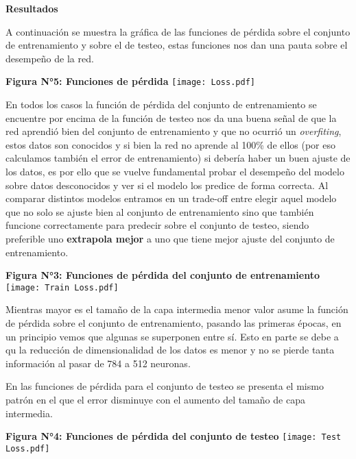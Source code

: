 \documentclass[12pt,a4paper]{article}
\begin{document}
\begin{multicols}{2}
\begin{center}
\begin{large}
\textbf{Resultados}
\end{large}
\end{center}

A continuación se muestra la gráfica de las funciones de pérdida sobre el conjunto de entrenamiento y sobre el de testeo, estas funciones nos dan una pauta sobre el desempeño de la red.

\begin{center}
\textbf{Figura N°5: Funciones de pérdida}
\texttt{[image: Loss.pdf]}
\end{center}

En todos los casos la función de pérdida del conjunto de entrenamiento se encuentre por encima de la función de testeo nos da una buena señal de que la red aprendió bien del conjunto de entrenamiento y que no ocurrió un \textit{overfiting}, estos datos son conocidos y si bien la red no aprende al 100\% de ellos (por eso calculamos también el error de entrenamiento) si debería haber un buen ajuste de los datos, es por ello que se vuelve fundamental probar el desempeño del modelo sobre datos desconocidos y ver si el modelo los predice de forma correcta. Al comparar distintos modelos entramos en un trade-off entre elegir aquel modelo que no solo se ajuste bien al conjunto de entrenamiento sino que también funcione correctamente para predecir sobre el conjunto de testeo, siendo preferible uno \textbf{extrapola mejor} a uno que tiene mejor ajuste del conjunto de entrenamiento.

\begin{center}
\textbf{Figura N°3: Funciones de pérdida del conjunto de entrenamiento}
\texttt{[image: Train Loss.pdf]}
\end{center}

Mientras mayor es el tamaño de la capa intermedia menor valor asume la función de pérdida sobre el conjunto de entrenamiento, pasando las primeras épocas, en un principio vemos que algunas se superponen entre sí. Esto en parte se debe a qu la reducción de dimensionalidad de los datos es menor y no se pierde tanta información al pasar de 784 a 512 neuronas. 

En las funciones de pérdida para el conjunto de testeo se presenta el mismo patrón en el que el error disminuye con el aumento del tamaño de capa intermedia. 

\begin{center}
\textbf{Figura N°4: Funciones de pérdida del conjunto de testeo}
\texttt{[image: Test Loss.pdf]}
\end{center}



\end{multicols}
\end{document}
